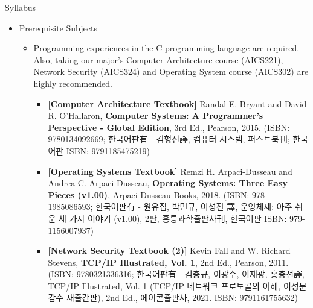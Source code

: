 \begin{frame}{Syllabus}
  \begin{itemize}
  \item Prerequisite Subjects
    \begin{itemize}
      \item Programming experiences in the C programming language are required. Also, taking our major's Computer Architecture course (AICS221), Network Security (AICS324) and Operating System course (AICS302) are highly recommended.
      \begin{itemize}
        \item \textbf{[Computer Architecture Textbook]} Randal E. Bryant and David R. O'Hallaron, \textbf{Computer Systems: A Programmer's Perspective - Global Edition}, 3rd Ed., Pearson, 2015. (ISBN: 9780134092669; 한국어판有 - 김형신譯, 컴퓨터 시스템, 퍼스트북刊; 한국어판 ISBN: 9791185475219)
        \item \textbf{[Operating Systems Textbook]} Remzi H. Arpaci-Dusseau and Andrea C. Arpaci-Dusseau, \textbf{Operating Systems: Three Easy Pieces (v1.00)}, Arpaci-Dusseau Books, 2018. (ISBN: 978-1985086593; 한국어판有 - 원유집, 박민규, 이성진 譯, 운영체제: 아주 쉬운 세 가지 이야기 (v1.00), 2판, 홍릉과학출판사刊, 한국어판 ISBN: 979-1156007937)
        \item \textbf{[Network Security Textbook (2)]} Kevin Fall and W. Richard Stevens, \textbf{TCP/IP Illustrated, Vol. 1}, 2nd Ed., Pearson, 2011. (ISBN: 9780321336316; 한국어판有 - 김충규, 이광수, 이재광, 홍충선譯, TCP/IP Illustrated, Vol. 1 (TCP/IP 네트워크 프로토콜의 이해, 이정문 감수 재출간판), 2nd Ed., 에이콘출판사, 2021. ISBN: 9791161755632)
      \end{itemize}
    \end{itemize}
  \end{itemize}
\end{frame}

